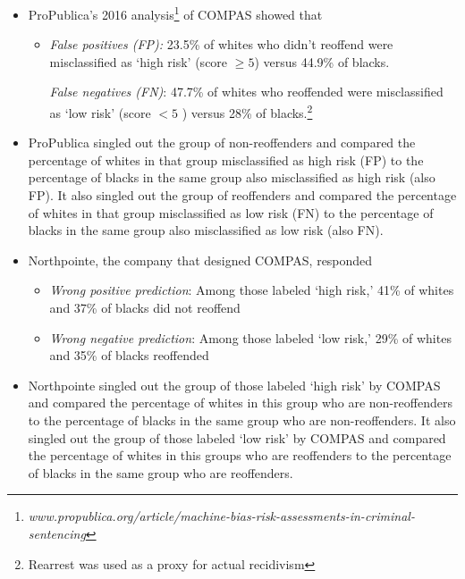 \documentclass{tufte-handout}
\begin{document}
\begin{itemize}

\item[] ProPublica's 2016 analysis\footnote{\textit{www.propublica.org/article/machine-bias-risk-assessments-in-criminal-sentencing}} of COMPAS showed that

\begin{itemize}

\item[] \textit{False positives (FP):} 23.5\% of whites who didn't reoffend were misclassified as `high risk' (score $\geq 5$) versus 44.9\% of blacks.

\textit{False negatives (FN)}: 47.7\% of whites who reoffended were misclassified as `low risk' (score 
$<5$ ) versus 28\% of blacks.\footnote{Rearrest was used as a proxy for actual recidivism}
\end{itemize}

\item[] ProPublica singled out the group of non-reoffenders and compared the percentage of whites in that group misclassified 
as high risk (FP) to the percentage of blacks in the same group also misclassified as high risk (also FP). It also singled out 
the group of reoffenders and compared the percentage of whites in that group misclassified as low risk (FN) to the 
percentage of blacks in the same group also misclassified as low risk (also FN).

\item[] Northpointe, the company that designed COMPAS, responded

\begin{itemize}

\item[] \textit{Wrong positive prediction}: Among those labeled  `high risk,' 41\% of whites and 37\% of blacks did not reoffend

\item[] \textit{Wrong negative prediction}: Among those labeled `low risk,' 29\% of whites and 35\% of blacks reoffended
\end{itemize}

\item[]%
Northpointe singled out the group of those labeled `high risk' by COMPAS and compared the percentage of whites 
in this group who 
are non-reoffenders to the percentage of blacks in the same group who are non-reoffenders.
It also singled out the group of those labeled `low risk' by COMPAS and compared the percentage of whites in this groups who   
are reoffenders to the percentage of blacks in the same group who are reoffenders. 
\end{itemize}
\end{document}
